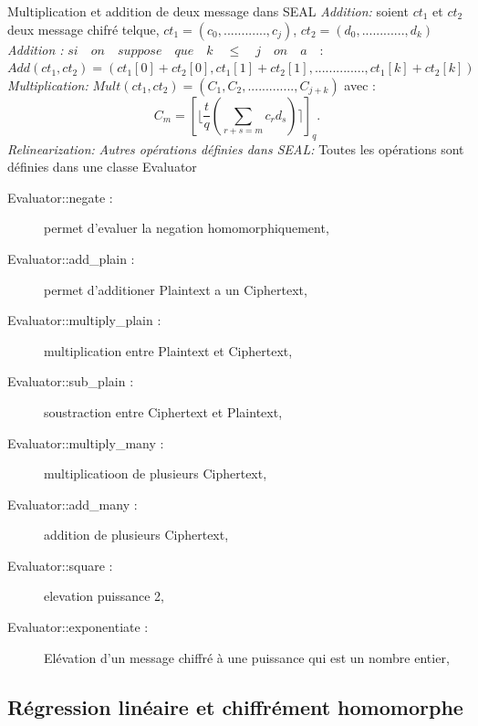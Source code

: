\documentclass[a4paper,12pt]{article}
\begin{document}
Multiplication et addition de deux message dans SEAL\newline
\textit{Addition:}\newline
soient $ct_1$ et $ct_2$ deux message chifré telque,\newline
$ct_1 = (c_0,............,c_j)$, $ct_2 = (d_0,............,d_k)$
\newline
\textit{Addition : }\newline
\newline
$si\quad on\quad suppose\quad que\quad k\quad \leq \quad j\quad on\quad a \quad:$\newline
\newline
$Add(ct_1, ct_2) = (ct_1[0]+ct_2[0],ct_1[1]+ct_2[1],..............,ct_1[k]+ct_2[k])$\newline
\newline
\textit{Multiplication:}\newline
\newline
$Mult(ct_1, ct_2) = (C_1,C_2,............., C_{j+k})$ avec :\newline
$$C_m = [\lfloor\dfrac{t}{q}(\sum_{r+s=m}^{}c_rd_s)\rceil]_q.$$
\textit{Relinearization:}\newline
\newline
\textit{Autres opérations définies dans SEAL:}\newline
Toutes les opérations sont définies dans une classe Evaluator\newline
\begin{description}
 \item[Evaluator::negate :] permet d'evaluer la negation homomorphiquement,
 \item[Evaluator::add\_plain :] permet d'additioner Plaintext a un Ciphertext,
 \item[Evaluator::multiply\_plain :] multiplication entre Plaintext et Ciphertext,
 \item[Evaluator::sub\_plain :] soustraction entre Ciphertext et Plaintext,
 \item[Evaluator::multiply\_many :] multiplicatioon de plusieurs Ciphertext,
 \item[Evaluator::add\_many :] addition de plusieurs Ciphertext,
 \item[Evaluator::square :] elevation puissance 2,
 \item[Evaluator::exponentiate :] Elévation d'un message chiffré à une puissance qui est un nombre entier,
  \end{description}
  \subsection{Régression linéaire et chiffrément homomorphe}
\end{document}
